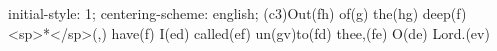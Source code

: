 initial-style: 1;
centering-scheme: english;
(c3)Out(fh) of(g) the(hg) deep(f) <sp>*</sp>(,) have(f) I(ed) called(ef) un(gv)to(fd) thee,(fe) O(de) Lord.(ev)
